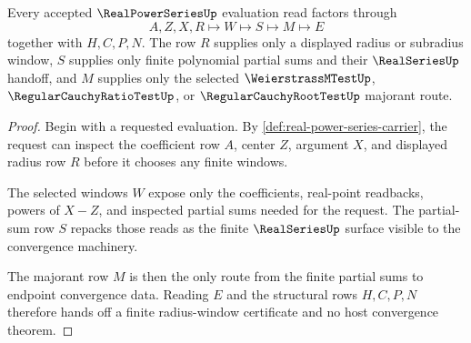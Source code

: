 \begin{theorem}\label{thm:real-power-series-radius-window-handoff}
Every accepted $\RealPowerSeriesUp$ evaluation read factors through
$$
A,Z,X,R\longmapsto W\longmapsto S\longmapsto M\longmapsto E
$$
together with $H,C,P,N$. The row $R$ supplies only a displayed radius or subradius window, $S$ supplies only finite polynomial partial sums and their $\RealSeriesUp$ handoff, and $M$ supplies only the selected $\WeierstrassMTestUp$, $\RegularCauchyRatioTestUp$, or $\RegularCauchyRootTestUp$ majorant route.
\end{theorem}
\begin{proof}
Begin with a requested evaluation. By \autoref{def:real-power-series-carrier}, the request can inspect the coefficient row $A$, center $Z$, argument $X$, and displayed radius row $R$ before it chooses any finite windows.

The selected windows $W$ expose only the coefficients, real-point readbacks, powers of $X-Z$, and inspected partial sums needed for the request. The partial-sum row $S$ repacks those reads as the finite $\RealSeriesUp$ surface visible to the convergence machinery.

The majorant row $M$ is then the only route from the finite partial sums to endpoint convergence data. Reading $E$ and the structural rows $H,C,P,N$ therefore hands off a finite radius-window certificate and no host convergence theorem.
\end{proof}

